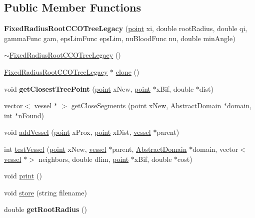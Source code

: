 \subsection*{Public Member Functions}
\begin{DoxyCompactItemize}
\item 
\mbox{\label{class_fixed_radius_root_c_c_o_tree_legacy_a1eb79d5da0580cf9ea31ed51d215a676}} 
{\bfseries Fixed\+Radius\+Root\+C\+C\+O\+Tree\+Legacy} (\mbox{\hyperlink{structpoint}{point}} xi, double root\+Radius, double qi, gamma\+Func gam, eps\+Lim\+Func eps\+Lim, nu\+Blood\+Func nu, double min\+Angle)
\item 
\mbox{\hyperlink{class_fixed_radius_root_c_c_o_tree_legacy_a4cf9e8bf1edd2cb4c7f22a3deb9b52ff}{$\sim$\+Fixed\+Radius\+Root\+C\+C\+O\+Tree\+Legacy}} ()
\item 
\mbox{\hyperlink{class_fixed_radius_root_c_c_o_tree_legacy}{Fixed\+Radius\+Root\+C\+C\+O\+Tree\+Legacy}} $\ast$ \mbox{\hyperlink{class_fixed_radius_root_c_c_o_tree_legacy_a7ee8da3159245b4000e631c199762f61}{clone}} ()
\item 
\mbox{\label{class_fixed_radius_root_c_c_o_tree_legacy_a43a7c1b6584b258580538764f0a17c18}} 
void {\bfseries get\+Closest\+Tree\+Point} (\mbox{\hyperlink{structpoint}{point}} x\+New, \mbox{\hyperlink{structpoint}{point}} $\ast$x\+Bif, double $\ast$dist)
\item 
vector$<$ \mbox{\hyperlink{structvessel}{vessel}} $\ast$ $>$ \mbox{\hyperlink{class_fixed_radius_root_c_c_o_tree_legacy_affd26c5ca4319ea7f207e4eb1bfea6b1}{get\+Close\+Segments}} (\mbox{\hyperlink{structpoint}{point}} x\+New, \mbox{\hyperlink{class_abstract_domain}{Abstract\+Domain}} $\ast$domain, int $\ast$n\+Found)
\item 
void \mbox{\hyperlink{class_fixed_radius_root_c_c_o_tree_legacy_a8322a2cf314cae0c93db3e0d53f4942b}{add\+Vessel}} (\mbox{\hyperlink{structpoint}{point}} x\+Prox, \mbox{\hyperlink{structpoint}{point}} x\+Dist, \mbox{\hyperlink{structvessel}{vessel}} $\ast$parent)
\item 
int \mbox{\hyperlink{class_fixed_radius_root_c_c_o_tree_legacy_a1b36d4046bc3d3ac897eec5d1cec0308}{test\+Vessel}} (\mbox{\hyperlink{structpoint}{point}} x\+New, \mbox{\hyperlink{structvessel}{vessel}} $\ast$parent, \mbox{\hyperlink{class_abstract_domain}{Abstract\+Domain}} $\ast$domain, vector$<$ \mbox{\hyperlink{structvessel}{vessel}} $\ast$$>$ neighbors, double dlim, \mbox{\hyperlink{structpoint}{point}} $\ast$x\+Bif, double $\ast$cost)
\item 
void \mbox{\hyperlink{class_fixed_radius_root_c_c_o_tree_legacy_a0de200e3f10bdd9c2fc4e3c1f37334e1}{print}} ()
\item 
void \mbox{\hyperlink{class_fixed_radius_root_c_c_o_tree_legacy_ae62b6fcd1aa0f3772aea173d036f8bb7}{store}} (string filename)
\item 
\mbox{\label{class_fixed_radius_root_c_c_o_tree_legacy_a4101d7bb1970dda44e58b788ccc58e5e}} 
double {\bfseries get\+Root\+Radius} ()
\end{DoxyCompactItemize}
